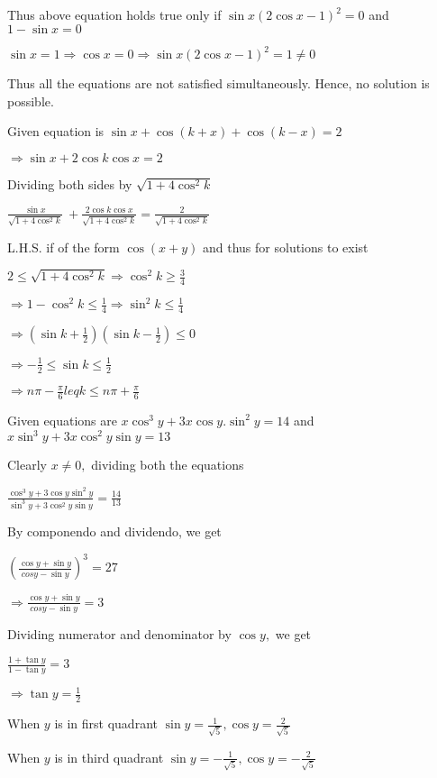   Thus above equation holds true only if $\sin x(2\cos x - 1)^2 = 0$ and $1 - \sin x = 0$

  $\sin x = 1 \Rightarrow \cos x = 0 \Rightarrow \sin x(2\cos x - 1)^2 = 1\neq 0$

  Thus all the equations are not satisfied simultaneously. Hence, no solution is possible.

\item Given equation is $\sin x + \cos(k + x) + \cos(k - x) = 2$

  $\Rightarrow \sin x + 2\cos k\cos x = 2$

  Dividing both sides by $\sqrt{1 + 4\cos^2k}$

  $\frac{\sin x}{\sqrt{1 + 4\cos^2k}}\ + \frac{2\cos k\cos x}{\sqrt{1 + 4\cos^2k}} = \frac{2}{\sqrt{1 + 4\cos^2k}}$

  L.H.S. if of the form $\cos(x + y)$ and thus for solutions to exist

  $2\leq \sqrt{1 + 4\cos^2k} \Rightarrow \cos^2k \geq \frac{3}{4}$

  $\Rightarrow 1 - \cos^2k\leq \frac{1}{4} \Rightarrow \sin^2k\leq \frac{1}{4}$

  $\Rightarrow \left(\sin k + \frac{1}{2}\right)\left(\sin k - \frac{1}{2}\right)\leq 0$

  $\Rightarrow -\frac{1}{2}\leq \sin k\leq \frac{1}{2}$

  $\Rightarrow n\pi - \frac{\pi}{6}leq k \leq n\pi + \frac{\pi}{6}$

\item Given equations are $x\cos^3y + 3x\cos y.\sin^2y = 14$ and $x\sin^3y + 3x\cos^2y\sin y = 13$

  Clearly $x\neq 0,$ dividing both the equations

  $\frac{\cos^3y + 3\cos y\sin^2y}{\sin^3y + 3\cos^2y\sin y} = \frac{14}{13}$

  By componendo and dividendo, we get

  $\left(\frac{\cos y + \sin y}{cos y - \sin y}\right)^3 = 27$

  $\Rightarrow \frac{\cos y + \sin y}{cos y - \sin y} = 3$

  Dividing numerator and denominator by $\cos y,$ we get

  $\frac{1 + \tan y}{1 - \tan y} = 3$

  $\Rightarrow \tan y = \frac{1}{2}$

  When $y$ is in first quadrant $\sin y = \frac{1}{\sqrt{5}}, \cos y = \frac{2}{\sqrt{5}}$

  When $y$ is in third quadrant $\sin y = -\frac{1}{\sqrt{5}}, \cos y = -\frac{2}{\sqrt{5}}$

